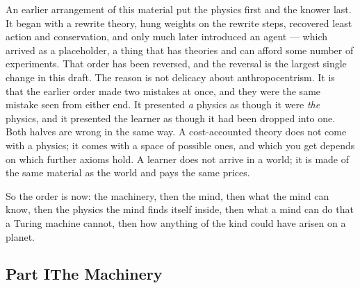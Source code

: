 \documentclass[12pt,openright,twoside]{book}
\theoremstyle{remark}
\theoremstyle{plain}
\theoremstyle{remark}
\theoremstyle{plain}
\theoremstyle{plain}
\begin{document}
An earlier arrangement of this material put the physics first and the
knower last.
It began with a rewrite theory, hung weights on the rewrite steps,
recovered least action and conservation, and only much later introduced
an agent --- which arrived as a placeholder, a thing that has theories
and can afford some number of experiments.
That order has been reversed, and the reversal is the largest single
change in this draft.
The reason is not delicacy about anthropocentrism.
It is that the earlier order made two mistakes at once, and they were the
same mistake seen from either end.
It presented \emph{a} physics as though it were \emph{the} physics, and
it presented the learner as though it had been dropped into one.
Both halves are wrong in the same way.
A cost-accounted theory does not come with a physics; it comes with a
space of possible ones, and which you get depends on which further axioms
hold.
A learner does not arrive in a world; it is made of the same material as
the world and pays the same prices.

So the order is now: the machinery, then the mind, then what the mind can
know, then the physics the mind finds itself inside, then what a mind can
do that a Turing machine cannot, then how anything of the kind could have
arisen on a planet.

\bigskip

\subsection*{Part I\quad The Machinery}
\end{document}
